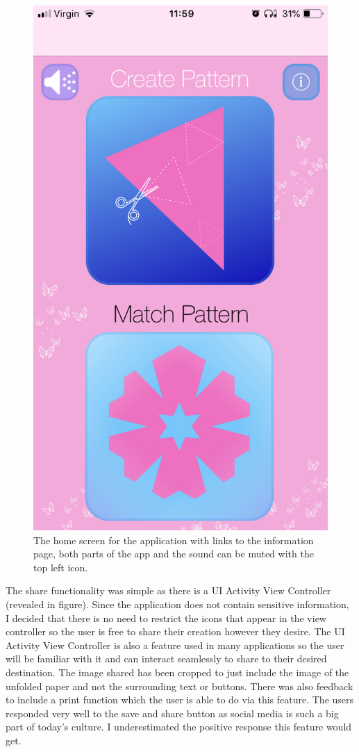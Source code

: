 \documentclass[11pt]{article}
\begin{document}
\begin{figure}[!ht]
\begin{minipage}{0.45\textwidth}
                            \includegraphics[width=0.7\linewidth]{KiriZen/main}
                            \caption{The home screen for the application with links to the information page, both parts of the app and the sound can be muted with the top left icon.}
                            \label{fig:kiriZen-main}
                        \end{minipage}
                    \end{figure}
                
                The share functionality was simple as there is a UI Activity View Controller (revealed in figure). Since the application does not contain sensitive information, I decided that there is no need to restrict the icons that appear in the view controller so the user is free to share their creation however they desire. The UI Activity View Controller is also a feature used in many applications so the user will be familiar with it and can interact seamlessly to share to their desired destination. The image shared has been cropped to just include the image of the unfolded paper and not the surrounding text or buttons. There was also feedback to include a print function which the user is able to do via this feature. The users responded very well to the save and share button as social media is such a big part of today's culture. I underestimated the positive response this feature would get.
            
\end{document}
